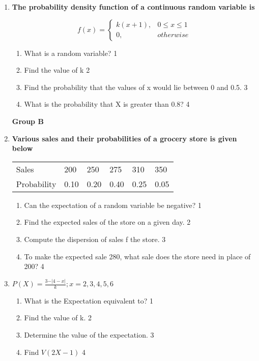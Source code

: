\documentclass{article}
\begin{document}
\begin{enumerate}
 \item
  \textbf{The probability density function of a continuous random variable is}

$$
  f(x) =
\begin{cases}
k(x+1),  & 0 \le x \le 1 \\
0, & otherwise
\end{cases}
$$

  \begin{enumerate}
    \item
	What is a random variable? \hfill 1
    \item
    	Find the value of k \hfill 2
    \item
    	Find the probability that the values of x would lie between 0 and 0.5. \hfill 3
     \item
     	What is the probability that X is greater than 0.8?  \hfill 4
  \end{enumerate}

\begin{center}
\textbf{Group B}
\end{center}
  
      \item
  \textbf{Various sales and their probabilities of a grocery store is given below}
  
  \begin{table}[h]
  \centering
\begin{tabular}{llllll}
Sales & 200 & 250 & 275 & 310 & 350 \\
Probability & 0.10 & 0.20 & 0.40 & 0.25 & 0.05
\end{tabular}
\end{table}

  \begin{enumerate}
    \item
	Can the expectation of a random variable be negative? \hfill 1
    \item
    	Find the expected sales of the store on a given day. \hfill 2
    \item
    	Compute the dispersion of sales f the store. \hfill 3
     \item
     	To make the expected sale 280, what sale does the store need in place of 200? \hfill 4
  \end{enumerate}
  
      \item
  \textbf{$P(X) = \frac{3-\vert 4-x\vert}{k}; x=2,3,4,5,6$}

  \begin{enumerate}
    \item
	What is the Expectation equivalent to? \hfill 1
    \item
    	Find the value of k. \hfill 2
    \item
    	Determine the value of the expectation. \hfill 3
     \item
     	Find $V(2X-1)$ \hfill 4
  \end{enumerate}


\end{enumerate}
\end{document}
